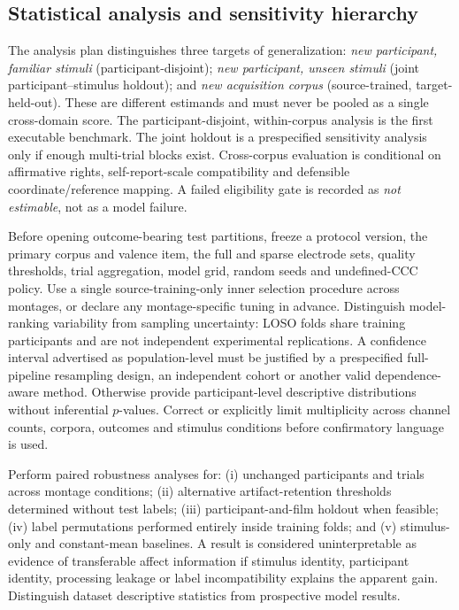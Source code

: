 \subsection{Statistical analysis and sensitivity hierarchy}
The analysis plan distinguishes three targets of generalization:
\emph{new participant, familiar stimuli} (participant-disjoint);
\emph{new participant, unseen stimuli} (joint participant--stimulus
holdout); and \emph{new acquisition corpus} (source-trained, target-held-out).
These are different estimands and must never be pooled as a single
cross-domain score. The participant-disjoint, within-corpus analysis is
the first executable benchmark. The joint holdout is a prespecified
sensitivity analysis only if enough multi-trial blocks exist. Cross-corpus
evaluation is conditional on affirmative rights, self-report-scale
compatibility and defensible coordinate/reference mapping. A failed
eligibility gate is recorded as \emph{not estimable}, not as a model failure.

Before opening outcome-bearing test partitions, freeze a protocol version,
the primary corpus and valence item, the full and sparse electrode sets,
quality thresholds, trial aggregation, model grid, random seeds and
undefined-CCC policy. Use a single source-training-only inner selection
procedure across montages, or declare any montage-specific tuning in
advance. Distinguish model-ranking variability from sampling uncertainty:
LOSO folds share training participants and are not independent
experimental replications. A confidence interval advertised as
population-level must be justified by a prespecified full-pipeline
resampling design, an independent cohort or another valid dependence-aware
method. Otherwise provide participant-level descriptive distributions
without inferential $p$-values. Correct or explicitly limit multiplicity
across channel counts, corpora, outcomes and stimulus conditions before
confirmatory language is used.

Perform paired robustness analyses for: (i) unchanged participants and
trials across montage conditions; (ii) alternative artifact-retention
thresholds determined without test labels; (iii) participant-and-film
holdout when feasible; (iv) label permutations performed entirely inside
training folds; and (v) stimulus-only and constant-mean baselines. A result
is considered uninterpretable as evidence of transferable affect
information if stimulus identity, participant identity, processing
leakage or label incompatibility explains the apparent gain. Distinguish
dataset descriptive statistics from prospective model results.

